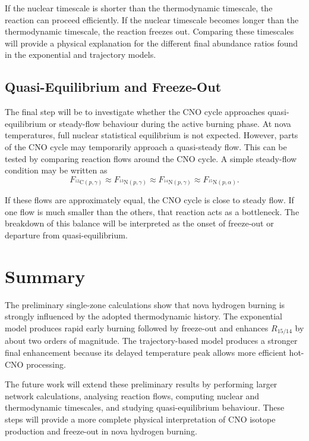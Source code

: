 If the nuclear timescale is shorter than the thermodynamic timescale, the reaction can proceed efficiently. If the nuclear timescale becomes longer than the thermodynamic timescale, the reaction freezes out. Comparing these timescales will provide a physical explanation for the different final abundance ratios found in the exponential and trajectory models.

\subsection{Quasi-Equilibrium and Freeze-Out}

The final step will be to investigate whether the CNO cycle approaches quasi-equilibrium or steady-flow behaviour during the active burning phase. At nova temperatures, full nuclear statistical equilibrium is not expected. However, parts of the CNO cycle may temporarily approach a quasi-steady flow. This can be tested by comparing reaction flows around the CNO cycle. A simple steady-flow condition may be written as
\[
F_{^{12}\mathrm{C}(p,\gamma)}
\approx
F_{^{13}\mathrm{N}(p,\gamma)}
\approx
F_{^{14}\mathrm{N}(p,\gamma)}
\approx
F_{^{15}\mathrm{N}(p,\alpha)} .
\]

If these flows are approximately equal, the CNO cycle is close to steady flow. If one flow is much smaller than the others, that reaction acts as a bottleneck. The breakdown of this balance will be interpreted as the onset of freeze-out or departure from quasi-equilibrium.

\section{Summary}

The preliminary single-zone calculations show that nova hydrogen burning is strongly influenced by the adopted thermodynamic history. The exponential model produces rapid early burning followed by freeze-out and enhances $R_{15/14}$ by about two orders of magnitude. The trajectory-based model produces a stronger final enhancement because its delayed temperature peak allows more efficient hot-CNO processing.

The future work will extend these preliminary results by performing larger network calculations, analysing reaction flows, computing nuclear and thermodynamic timescales, and studying quasi-equilibrium behaviour. These steps will provide a more complete physical interpretation of CNO isotope production and freeze-out in nova hydrogen burning.